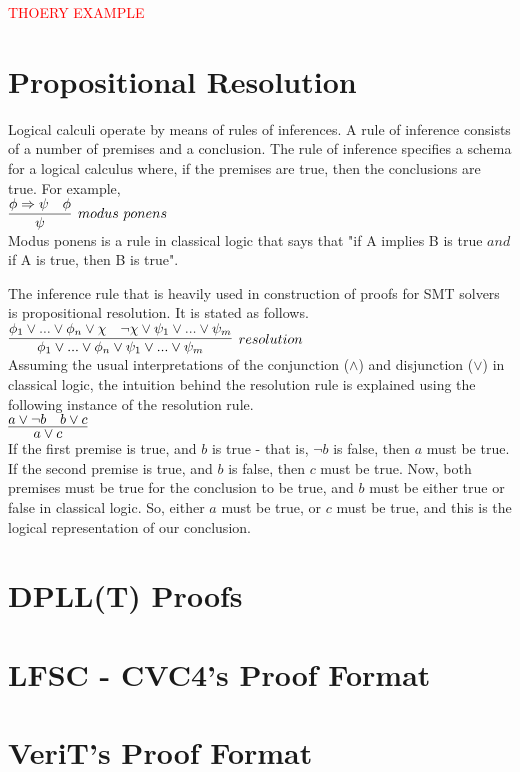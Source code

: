 \documentclass{article}
\begin{document}
\textcolor{red}{THOERY EXAMPLE}

\section{Propositional Resolution}
Logical calculi operate by means of rules of inferences. A
rule of inference consists of a number of premises and a 
conclusion. The rule of inference specifies a schema for a 
logical calculus where, if the premises are true, then 
the conclusions are true. For example, \\
$\infer[modus\ ponens]{\psi}{\phi \Rightarrow \psi & \phi}$ \\
Modus ponens is a rule in classical logic that says that 
"if A implies B is true $and$ if A is true, then B is true".

The inference rule that is heavily used in construction of 
proofs for SMT solvers is propositional resolution. It is
stated as follows. \\
$\infer[resolution]{\phi_1 \lor ... \lor \phi_n \lor \psi_1 \lor ... \lor \psi_m}
{\phi_1 \lor ... \lor \phi_n \lor \chi & \neg \chi \lor \psi_1 \lor ... \lor \psi_m}$ \\

Assuming the usual interpretations of the conjunction
($\land$) and disjunction ($\lor$) in classical logic, the 
intuition behind the resolution rule is explained using the 
following instance of the resolution rule. \\
$\infer{a \lor c}{a \lor \neg b & b \lor c}$ \\
If the first premise is true, and $b$ is true - that is, 
$\neg b$ is false, then $a$ must be true. If the second 
premise is true, and $b$ is false, then $c$ must be true.
Now, both premises must be true for the conclusion to be true, 
and $b$ must be either true or false in classical logic. 
So, either $a$ must be true, or $c$ must be true, and this 
is the logical representation of our conclusion.
\section{DPLL(T) Proofs}

\section{LFSC - CVC4's Proof Format}

\section{VeriT's Proof Format}
\end{document}
